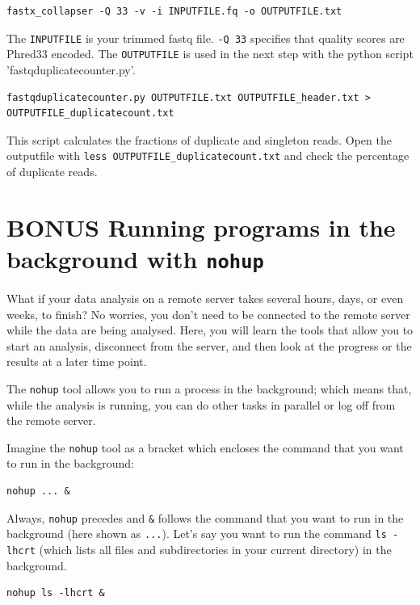 \documentclass[11pt]{article}
\begin{document}
\begin{verbatim}
fastx_collapser -Q 33 -v -i INPUTFILE.fq -o OUTPUTFILE.txt
\end{verbatim}

The \texttt{INPUTFILE} is your trimmed fastq file. \texttt{-Q 33} specifies that
quality scores are Phred33 encoded.  The \texttt{OUTPUTFILE} is used in the
next step with the python script 'fastqduplicatecounter.py'.

\begin{verbatim}
fastqduplicatecounter.py OUTPUTFILE.txt OUTPUTFILE_header.txt > OUTPUTFILE_duplicatecount.txt
\end{verbatim}

This script calculates the fractions of duplicate and singleton
reads. Open the outputfile with \texttt{less OUTPUTFILE\_duplicatecount.txt}
and check the percentage of duplicate reads.
\section{BONUS Running programs in the background with \texttt{nohup}}
\label{sec-5}
What if your data analysis on a remote server takes several hours,
days, or even weeks, to finish? No worries, you don't need to be
connected to the remote server while the data are being
analysed. Here, you will learn the tools that allow you to start
an analysis, disconnect from the server, and then look at the progress
or the results at a later time point.

The \texttt{nohup} tool allows you to run a process in the background; which
means that, while the analysis is running, you can do other tasks in
parallel or log off from the remote server.

Imagine the \texttt{nohup} tool as a bracket which encloses the command that
you want to run in the background:

\begin{verbatim}
nohup ... &
\end{verbatim}

Always, \texttt{nohup} precedes and \texttt{\&} follows the command that you want to
run in the background (here shown as \texttt{...}). Let's say you want to run
the command \texttt{ls -lhcrt} (which lists all files and subdirectories in
your current directory) in the background.

\begin{verbatim}
nohup ls -lhcrt &
\end{verbatim}
\end{document}
